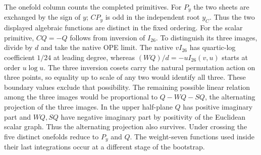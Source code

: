 The onefold column counts the completed primitives. For \(P_y\) the two
sheets are exchanged by the sign of \(y\); \(CP_y\) is odd in the independent
root \(y_C\). Thus the two displayed algebraic functions are distinct in the
fixed ordering. For the scalar primitive, \(CQ=-Q\) follows from inversion
of \(I_{26}\). To distinguish its three images, divide by \(d\) and take the
native OPE limit. The native \(vI_{26}\) has quartic-log coefficient \(1/24\)
at leading degree, whereas \((WQ)/d=-uI_{26}(v,u)\) starts at order
\(u\log u\). The three inversion cosets carry the natural permutation action on three points,
so equality up to scale of any two would identify all three. These
boundary values exclude that possibility. The remaining possible linear relation among the three images would be proportional to \(Q-WQ-SQ\), the alternating projection of the three images. In the upper half-plane \(Q\) has positive imaginary part and \(WQ,SQ\) have negative imaginary part by positivity of the Euclidean scalar graph. Thus the alternating projection also survives. Under crossing the five distinct
onefolds reduce to \(P_y\) and \(Q\). The weight-seven functions used inside
their last integrations occur at a different stage of the bootstrap.
